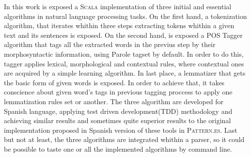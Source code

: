 
In this work is exposed a \textsc{Scala} implementation of three initial and 	essential algorithms in natural language processing tasks. On the first hand, a tokenization algorithm, that iterates whithin three steps extracting tokens whithin a given text and its sentences is exposed. On the second hand, is exposed a POS Tagger algorithm that tags all the extracted words in the previus step by their morphosyntactic information, using \textsf{Parole} tagset by default. In order to do this, tagger applies lexical, morphological and contextual rules, where contextual ones are acquired by a simple learning algorithm. In last place, a lemmatizer that gets the basic form of given words is exposed. In order to achieve that, it takes conscience about given word's tags in previous tagging proccess to apply one lemmatization rules set or another.\newline
The three algorithm are developed for Spanish language, applying test driven development(TDD) methodology and achieving similar results and sometimes quite superior results to the original implementation proposed in Spanish version of these tools in \textsc{Pattern.es}.
Last but not at least, the three algorithms are integrated whithin a parser, so it could be possible to taste one or all the implemented algorithms by command line.   
\newline

